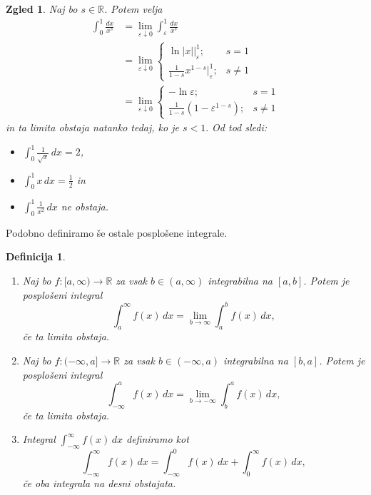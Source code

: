 \documentclass[10pt, a4paper]{article}
\newtheorem{defi}[izr]{Definicija}
\newenvironment{noticeB}{%
  \tcolorbox[%
  notitle,
  empty,
  enhanced,  %
  breakable,
  coltext=black,
  colback=white, 
  fontupper=\rmfamily,
  noparskip,
  sharp corners,
  boxrule=-1pt,  %
  frame hidden,
  left=7pt,  %
  right=7pt,
  top=5pt,
  bottom=5pt,
  before skip=2.5ex plus 2pt,
  after skip=2.5ex plus 2pt,
  borderline west = {1.5pt}{-0.1pt}{blue!30!black}, %
  overlay unbroken and last={%
    \draw[color=black, line width=1.25pt]
    ($(frame.south west)+(1.pt, -0.1pt)$) -- ++(2em, 0);
  }
  ]}
{\endtcolorbox}
\newenvironment{definicija}{\begin{noticeB}\begin{defi}}{%
\end{defi}\end{noticeB}}
\newtheorem{zgled}[izr]{Zgled}
\newcommand{\R}{\mathbb {R}}
\newcommand{\limf}[3]{\lim_{#1 \to #2} {#3}}
\newcommand{\rlimf}[3]{\lim_{#1 \downarrow #2} {#3}}
\begin{document}
\begin{zgled}
    Naj bo $s \in \R$. Potem velja \begin{align*}
        \int_0 ^1 \frac{dx}{x^s} &= \rlimf{\varepsilon}{0}{\int_{\varepsilon} ^1 \frac{dx}{x^s}}\\
        &= \rlimf{\varepsilon}{0}{\begin{cases}
            \ln |x| \Big|_{\varepsilon} ^1 ;& s = 1\\
            \frac{1}{1-s} x^{1-s} \big|_{\varepsilon} ^1 ;& s \neq 1
        \end{cases}}\\
        &= \rlimf{\varepsilon}{0}{\begin{cases}
            - \ln \varepsilon ; & s = 1\\
            \frac{1}{1-s} (1 - \varepsilon^{1-s}) ; & s \neq 1
        \end{cases}}
    \end{align*}
    in ta limita obstaja natanko tedaj, ko je $s < 1.$ Od tod sledi:
    \begin{itemize}
        \item $\int_0 ^1 \frac{1}{\sqrt{x}}\,dx = 2$,
        \item $\int_0 ^1 x\,dx = \frac{1}{2}$ in
        \item $\int_0 ^1 \frac{1}{x^2}\,dx$ ne obstaja.
    \end{itemize}
\end{zgled}

Podobno definiramo še ostale posplošene integrale.

\begin{definicija}
    \begin{enumerate}
        \item Naj bo $f:[a, \infty) \rightarrow \R$ za vsak $b \in (a, \infty)$ integrabilna na $[a, b]$. Potem je posplošeni integral 
        $$\int_a ^\infty f(x)\,dx = \limf{b}{\infty}{\int_a ^b f(x)\,dx},$$
        če ta limita obstaja.
        \item Naj bo $f:(-\infty, a] \rightarrow \R$ za vsak $b \in (-\infty, a)$ integrabilna na $[b, a]$. Potem je posplošeni integral 
        $$\int_{-\infty} ^a f(x)\,dx = \limf{b}{-\infty}{\int_b ^a f(x)\,dx},$$
        če ta limita obstaja.
        \item Integral $\int_{-\infty} ^\infty f(x)\,dx$ definiramo kot $$\int_{-\infty} ^\infty f(x)\,dx = \int_{-\infty} ^0 f(x)\,dx + \int_{0} ^\infty f(x)\,dx,$$
        če oba integrala na desni obstajata.
    \end{enumerate}
\end{definicija}
\end{document}
